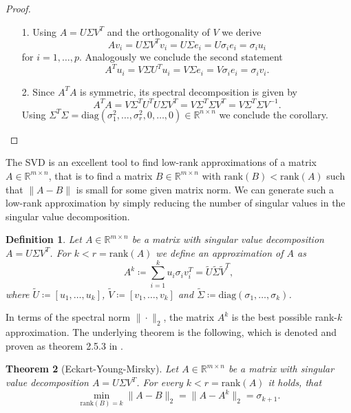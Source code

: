 \documentclass[11pt, a4paper]{article}
\newtheorem{theorem}{Theorem}[section]
\newtheorem{definition}[theorem]{Definition}
\newcommand{\R}{\mathds{R}}
\begin{document}
\begin{proof}
\ 
\begin{itemize}
\item[1.] Using $A=U \Sigma V^T$ and the orthogonality of $V$ we derive
\[ Av_i = U \Sigma V^T v_i = U \Sigma e_i = U \sigma_i e_i = \sigma_i u_i \]
for $i=1, \dots, p$. Analogously we conclude the second statement
\[ A^T u_i = V \Sigma U^T u_i = V \Sigma e_i = V \sigma_i e_i = \sigma_i v_i. \]
\item[2.] Since $A^TA$ is symmetric, its spectral decomposition is given by
\[ A^TA = V \Sigma^T U^T U \Sigma V^T = V \Sigma^T \Sigma V^T = V \Sigma^T \Sigma V^{-1}. \]
Using $\Sigma^T \Sigma = \text{diag}(\sigma_1^2, \dots, \sigma_r^2, 0, \dots, 0) \in \R^{n \times n}$ we conclude the corollary. \qedhere
\end{itemize}
\end{proof}

The SVD is an excellent tool to find low-rank approximations of a matrix $A \in \R^{m \times n}$, that is to find a matrix $B \in \R^{m \times n}$ with $\text{rank}(B) < \text{rank}(A)$ such that $\|A -B\|$ is small for some given matrix norm. We can generate such a low-rank approximation by simply reducing the number of singular values in the singular value decomposition.

\begin{definition}
Let $A \in \R^{m \times n}$ be a matrix with singular value decomposition $A=U \Sigma V^T$. For $k < r = \text{rank}(A)$ we define an approximation of $A$ as
\[ A^k \coloneq \sum_{i=1}^{k} u_i \sigma_i v_i^T = \tilde{U} \tilde{\Sigma} \tilde{V}^T, \]
where $\tilde{U} \coloneq [u_1, \dots, u_k]$, $\tilde{V} \coloneq [v_1, \dots, v_k]$ and $\tilde{\Sigma} \coloneq \text{diag}(\sigma_1, \dots, \sigma_k)$.
\end{definition}

In terms of the spectral norm $\| \cdot \|_2$, the matrix $A^k$ is the best possible rank-$k$ approximation. The underlying theorem is the following, which is denoted and proven as theorem 2.5.3 in \cite{SVD}.

\begin{theorem}[Eckart-Young-Mirsky] \label{thm:eym}
Let $A \in \R^{m \times n}$ be a matrix with singular value decomposition $A= U \Sigma V^T$. For every $k < r = \text{rank}(A)$ it holds, that
\[ \min_{\text{rank}(B)=k} \big \| A-B \big \|_2 = \big \| A - A^k \big \|_2 = \sigma_{k+1}. \]
\end{theorem}
\end{document}
